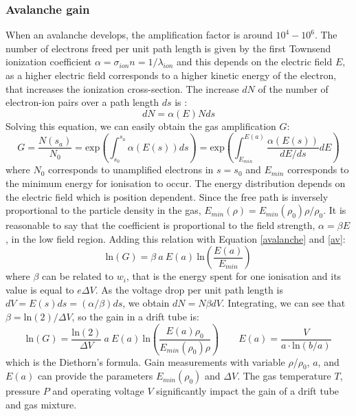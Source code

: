 \subsubsection{Avalanche gain}
When an avalanche develops, the amplification factor is around $10^4-10^6$. The number of electrons freed per unit path length is given
by the first Townsend ionization coefficient $\alpha=\sigma_{ion}n=1/\lambda_{ion}$ and this depends on the electric field $E$, 
as a higher electric field corresponds to a higher kinetic energy of the electron, that increases the ionization cross-section.
The increase $dN$ of the number of electron-ion pairs over a path length $ds$ is \cite{kola}:
\begin{equation}
    dN=\alpha(E)Nds
\end{equation}
Solving this equation, we can easily obtain the gas amplification $G$:
\begin{equation}\label{av}
    G=\frac{N(s_a)}{N_0}=\text{exp} \left( \int_{s_0}^{s_a} \alpha(E(s)) ds \right)=\text{exp} \left( \int_{E_{min}}^{E(a)} \frac{\alpha(E(s))}{dE/ds} dE \right)
\end{equation}
where $N_0$ corresponds to unamplified electrons in $s=s_0$ and $E_{min}$ corresponds to the minimum energy 
for ionisation to occur. The energy distribution depends on the electric field which is position dependent. 
Since the free path is inversely proportional to the particle density in the gas, $E_{min}(\rho)=E_{min}(\rho_0)\rho/\rho_0$.
It is reasonable to say that the coefficient is proportional to the field strength, $\alpha= \beta E$, in the low field region. 
Adding this relation with Equation \ref{avalanche} and \ref{av}:
\begin{equation}
     \text{ln}(G)=\beta \ a \ E(a) \ \text{ln}\left( \frac{E(a)}{E_{min}}\right)
\end{equation}
where $\beta$ can be related to $w_i$, that is the energy spent for one ionisation and its value is equal to $e \Delta V$.
As the voltage drop per unit path length is $dV = E(s)ds = (\alpha/\beta)ds$, we obtain $dN=N \beta dV$. Integrating, we can see that
$\beta= \text{ln}(2)/\Delta V$, so the gain in a drift tube is:
\begin{equation}\label{XXX}
     \text{ln}(G)=\frac{ \text{ln}(2)}{\Delta V} \ a \ E(a)  \ \text{ln}\left( \frac{E(a)\rho_0}{E_{min}(\rho_0)\rho}\right) \qquad E(a)=\frac{V}{a \cdot \text{ln}(b/a)}
\end{equation}
which is the Diethorn's formula. 
Gain measurements with variable $\rho$/$\rho_0$, $a$, and $E(a)$ can provide the parameters $E_{min} (\rho_0)$ and $\Delta V$. 
The gas temperature $T$, pressure $P$ and operating voltage $V$ significantly impact
the gain of a drift tube and gas mixture. 
